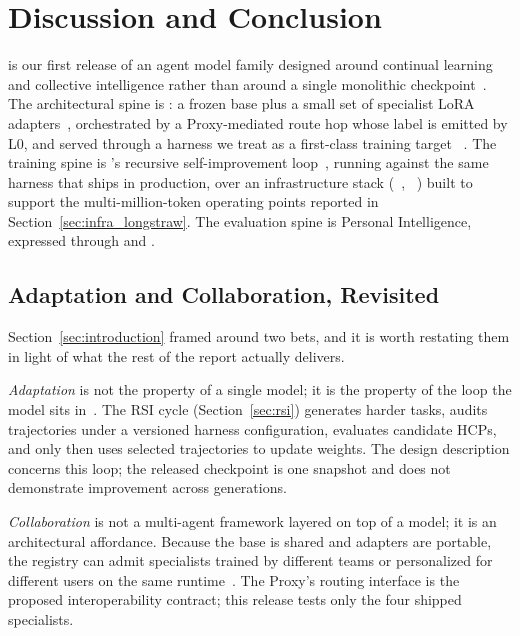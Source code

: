 \section{Discussion and Conclusion}
\label{sec:discussion}

\macaron{} is our first release of an agent model family designed around
continual learning and collective intelligence rather than around a single
monolithic checkpoint~\citep{macaron_v1_blog2026}. The architectural spine is
\molshort{}: a frozen base plus a small set of specialist LoRA
adapters~\citep{lora2022,mol_harness2026}, orchestrated by a Proxy-mediated route hop
whose label is emitted by L0, and served through a harness we treat as a first-class training target
~\citep{ui4a2026,wu2026replharnesses}. The training spine is \mindforge's
recursive self-improvement loop~\citep{macaron_v1_preview2026}, running against
the same harness that ships in production, over an infrastructure stack
(\mint~\citep{lu2026announcing}, \longstraw{}~\citep{zhou2026longstrawlongcontextrl2m})
built to support the multi-million-token operating points reported in
Section~\ref{sec:infra_longstraw}.
The evaluation spine is Personal Intelligence, expressed through \chatbench{}
and \livingbench.

\subsection{Adaptation and Collaboration, Revisited}
\label{sec:disc_bets}

Section~\ref{sec:introduction} framed \macaron{} around two bets, and it is worth restating them in light of what the rest of the report actually delivers.

\emph{Adaptation} is not the property of a single model; it is the property of the loop the model sits in~\citep{silver_sutton_experience_2025,yao_second_half_2025}. The RSI cycle (Section~\ref{sec:rsi}) generates harder tasks, audits trajectories under a versioned harness configuration, evaluates candidate HCPs, and only then uses selected trajectories to update weights. The design description concerns this loop; the released checkpoint is one snapshot and does not demonstrate improvement across generations.

\emph{Collaboration} is not a multi-agent framework layered on top of a model; it is an architectural affordance. Because the base is shared and adapters are portable, the registry can admit specialists trained by different teams or personalized for different users on the same runtime~\citep{macaron_v1_blog2026,lu2026announcing}. The Proxy's routing interface is the proposed interoperability contract; this release tests only the four shipped specialists.

